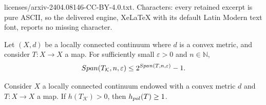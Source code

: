 \documentclass[10pt,a4paper]{amsart}
\newcommand*\induce[1]{#1_\mathcal{K}}
\begin{document}
licenses/arxiv-2404.08146-CC-BY-4.0.txt. Characters: every retained excerpt is pure ASCII, so the delivered engine, XeLaTeX with its default Latin Modern text font, reports no missing character.
\begin{lemma}\label{lemma:span-hyperspace-bounded-exponential-span-base}
    Let $(X, d)$ be a locally connected continuum where $d$ is a convex metric, and consider $T: X \to X$ a map. For sufficiently small $\varepsilon > 0$ and $n \in \mathbb{N}$,
    \begin{equation*}
        \emph{Span}(\induce{T}, n, \varepsilon) \leq 2^{\emph{Span}(T, n, \varepsilon)} - 1.
    \end{equation*}
\end{lemma}

\begin{lemma}\label{lemma:positive-entropy-induced-hyperspace-poly-entropy-one}
    Consider $X$ a locally connected continuum endowed with a convex metric $d$ and $T: X \to X$ a map. If $h(\induce{T}) > 0$, then $h_{\emph{pol}}(T) \geq 1$.
\end{lemma}
\end{document}
